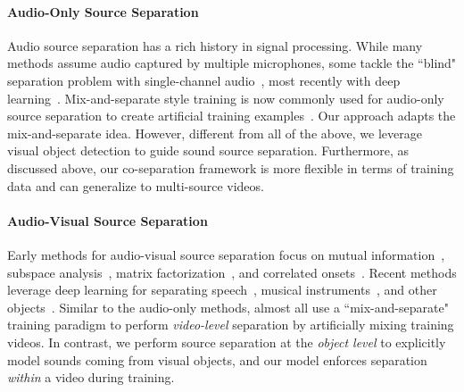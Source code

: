 \documentclass[10pt,twocolumn,letterpaper]{article}
\begin{document}
\paragraph{Audio-Only Source Separation}
Audio source separation has a rich history in signal processing. While many methods assume audio captured by multiple microphones, some tackle the ``blind" separation problem with single-channel audio~\cite{hyvarinen2000independent,ellis1996prediction,virtanen2007monaural,fevotte2009nonnegative}, most recently with deep learning~\cite{huang2014deep,hershey2016deep,stoller2018adversarial}. Mix-and-separate style training is now commonly used for audio-only source separation to create artificial training examples~\cite{huang2015joint,hershey2016deep,yu2017permutation}. Our approach adapts the mix-and-separate idea. However, different from all of the above, we leverage visual object detection to guide sound source separation. Furthermore, as discussed above, our co-separation framework is more flexible in terms of training data and can generalize to multi-source videos.

\vspace{-0.2in}
\paragraph{Audio-Visual Source Separation}
Early methods for audio-visual source separation focus on mutual information~\cite{fisher2001learning}, subspace analysis~\cite{smaragdis2003audio,pu2017audio}, matrix factorization~\cite{parekh2017motion,sedighin2016two}, and correlated onsets~\cite{barzelay2007harmony,li2017see}. Recent methods leverage deep learning for separating speech~\cite{ephrat2018looking,owens2018audio,afouras2018conversation,gabbay2017visual}, musical instruments~\cite{zhao2018sound,gao2019visualsound,zhao2019som}, and other objects~\cite{gao2018objectSounds}. Similar to the audio-only methods, almost all use a ``mix-and-separate" training paradigm to perform \emph{video-level} separation by artificially mixing training videos. In contrast, we perform source separation at the \emph{object level} to explicitly model sounds coming from visual objects, and our model enforces separation \emph{within} a video during training.
\end{document}
